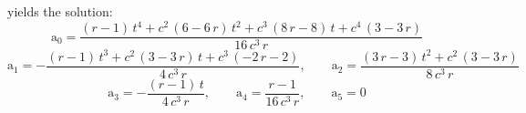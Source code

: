 yields the solution:
\begin{equation}
 \mathrm{a_0}=\frac{\left(r-1\right)\,t^4+c^2\,\left(6-6\,r\right)\,t^2+c^3\,\left(8\,r-8\right)\,t+c^4\,\left(3-3\,r\right)}{16\,c^3\,r}
\end{equation}
\begin{equation}
 \mathrm{a_1}=-\frac{\left(r-1\right)\,t^3+c^2\,\left(3-3\,r\right)\,t+c^3\,\left(-2\,r-2\right)}{4\,c^3\,r}, \qquad
 \mathrm{a_2}=\frac{\left(3\,r-3\right)\,t^2+c^2\,\left(3-3\,r\right)}{8\,c^3\,r} 
\end{equation}
\begin{equation}
 \mathrm{a_3}=-\frac{\left(r-1\right)\,t}{4\,c^3\,r}, \qquad
 \mathrm{a_4}=\frac{r-1}{16\,c^3\,r},                 \qquad
 \mathrm{a_5}=0  
\end{equation}





















